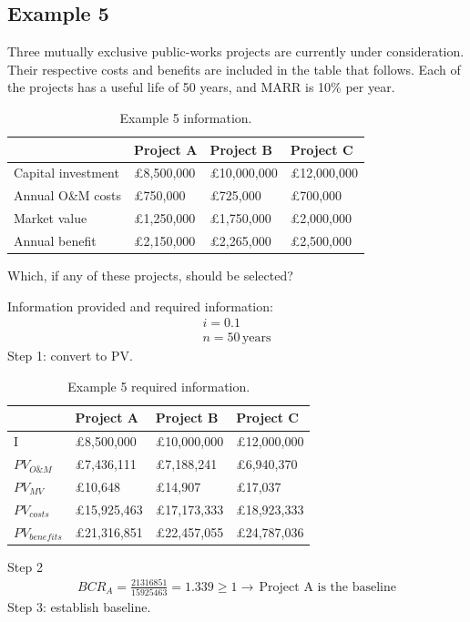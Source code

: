 \subsection{Example 5}
Three mutually exclusive public-works projects are currently under consideration. Their respective costs and benefits are included in the table that follows. Each of the projects has a useful life of 50 years, and MARR is 10\% per year.
\begin{table}[H]
  \centering
  \begin{tabular}{@{}llll@{}}
    \toprule
                       & Project A         & Project B          & Project C          \\
    \midrule
    Capital investment & \pounds 8,500,000 & \pounds 10,000,000 & \pounds 12,000,000 \\
    Annual O\&M costs  & \pounds 750,000   & \pounds 725,000    & \pounds 700,000    \\
    Market value       & \pounds 1,250,000 & \pounds 1,750,000  & \pounds 2,000,000  \\
    Annual benefit     & \pounds 2,150,000 & \pounds 2,265,000  & \pounds 2,500,000  \\
    \bottomrule
  \end{tabular}
  \caption{Example 5 information.}
\end{table}
Which, if any of these projects, should be selected?

Information provided and required information:
\begin{gather}
  i = 0.1\\
  n = 50\, \textrm{years}
\end{gather}
Step 1: convert to PV.
\begin{table}[H]
  \centering
  \begin{tabular}{@{}llll@{}}
    \toprule
                    & Project A          & Project B          & Project C          \\
    \midrule
    I               & \pounds 8,500,000  & \pounds 10,000,000 & \pounds 12,000,000 \\
    $PV_{O\&M}$     & \pounds 7,436,111  & \pounds 7,188,241  & \pounds 6,940,370  \\
    $PV_{MV}$       & \pounds 10,648     & \pounds 14,907     & \pounds 17,037     \\
    $PV_{costs}$    & \pounds 15,925,463 & \pounds 17,173,333 & \pounds 18,923,333 \\
    $PV_{benefits}$ & \pounds 21,316,851 & \pounds 22,457,055 & \pounds 24,787,036 \\
    \bottomrule
  \end{tabular}
  \caption{Example 5 required information.}
\end{table}
Step 2
\begin{gather}
  BCR_A = \frac{21316851}{15925463} = 1.339 \geq 1 \rightarrow\, \textrm{Project A is the baseline}
\end{gather}
Step 3: establish baseline.


